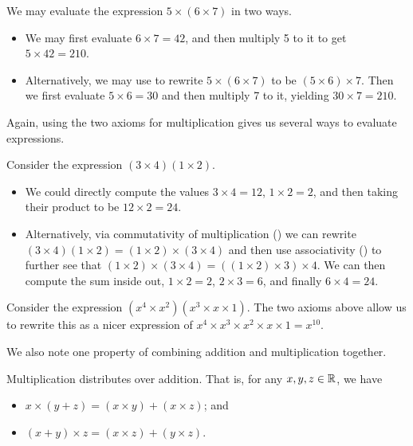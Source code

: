\begin{example}
    We may evaluate the expression $5\times(6\times7)$ in two ways.
    \begin{itemize}
        \item We may first evaluate $6\times7 = 42$, and then multiply 5 to it to get $5 \times 42 = 210$.
        \item Alternatively, we may use  to rewrite $5\times(6\times7)$ to be $(5\times6)\times7$. Then we first evaluate $5\times6 = 30$ and then multiply 7 to it, yielding $30\times7 = 210$.
    \end{itemize}
\end{example}

Again, using the two axioms for multiplication gives us several ways to evaluate expressions.
\begin{example}
    Consider the expression $(3\times4)(1\times2)$.
    \begin{itemize}
        \item We could directly compute the values $3 \times 4 = 12$, $1 \times 2 = 2$, and then taking their product to be $12\times2 = 24$.
        \item Alternatively, via commutativity of multiplication () we can rewrite $(3\times4)(1\times2)=(1\times2)\times(3\times4)$ and then use associativity () to further see that $(1\times2)\times(3\times4) = ((1\times2)\times3)\times4$. We can then compute the sum inside out, $1 \times 2 = 2$, $2 \times 3 = 6$, and finally $6 \times 4 = 24$.
    \end{itemize}
\end{example}

\begin{example}
    Consider the expression $(x^4\times x^2)(x^3 \times x \times 1)$. The two axioms above allow us to rewrite this as a nicer expression of $x^4 \times x^3 \times x^2 \times x \times 1 = x^{10}$.
\end{example}

We also note one property of combining addition and multiplication together.

\begin{axiom}\label{axiom-distributivity}
    Multiplication distributes over addition. That is, for any $x, y, z \in \mathbb{R}$, we have
    \begin{itemize}
        \item $x\times(y+z) = (x\times y) + (x\times z)$; and
        \item $(x+y)\times z = (x\times z) + (y\times z)$.
    \end{itemize}
\end{axiom}


